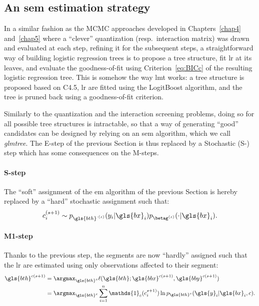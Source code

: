 \subsection{An \gls{sem} estimation strategy} \label{subsec:sem}

In a similar fashion as the MCMC approaches developed in Chapters~\ref{chap4} and~\ref{chap5} where a ``clever'' quantization (resp.\ interaction matrix) was drawn and evaluated at each step, refining it for the subsequent steps, a straightforward way of building logistic regression trees is to propose a tree structure, fit \gls{lr} at its leaves, and evaluate the goodness-of-fit using Criterion~\ref{eq:BICc} of the resulting logistic regression tree. This is somehow the way \gls{lmt} works: a tree structure is proposed based on C4.5, \gls{lr} are fitted using the LogitBoost algorithm, and the tree is pruned back using a goodness-of-fit criterion.

Similarly to the quantization and the interaction screening problems, doing so for all possible tree structures is intractable, so that a way of generating ``good'' candidates can be designed by relying on an \gls{sem} algorithm, which we call \textit{glmtree}. The E-step of the previous Section is thus replaced by a Stochastic (S-) step which has some consequences on the M-steps.
\paragraph{S-step} The ``soft'' assignment of the \gls{em} algorithm of the previous Section is hereby replaced by a ``hard'' stochastic assignment such that:
\[ c_i^{(s+1)} \sim p_{\gls{bth}^{\cdot(s)}}(y_i | \gls{bx}_i) p_{\betag^{(s)}}(\cdot | \gls{bx}_i). \]
\paragraph{M1-step} Thanks to the previous step, the segments are now ``hardly'' assigned such that the \gls{lr} are estimated using only observations affected to their segment:
\begin{align*}
\gls{bth}^{c(s+1)} & = \argmax_{\gls{bth}^c} \ell(\gls{bth};\gls{bbx}^{c(s+1)},\gls{bby}^{c(s+1)}) \\
& = \argmax_{\gls{bth}^c} \sum_{i=1}^n \mathds{1}_{c}(c_i^{s+1)}) \ln p_{\gls{bth}^c}(\gls{y}_i | \gls{bx}_i, c).
\end{align*}
